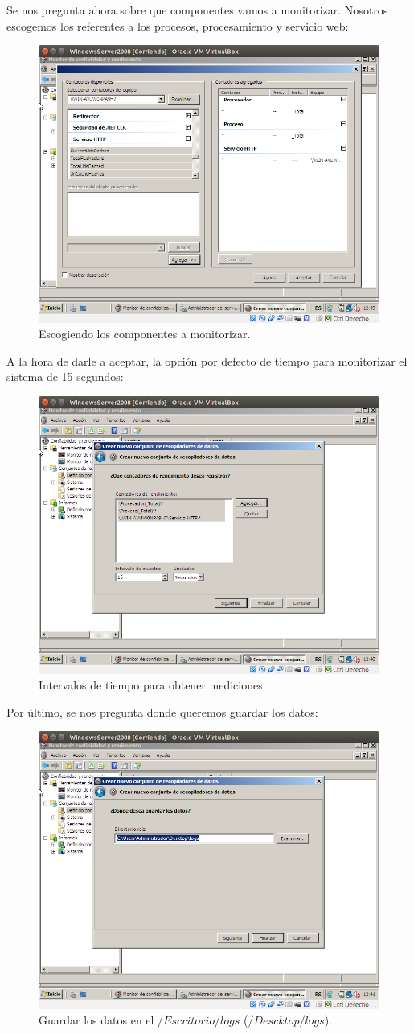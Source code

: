 \begin{itemize}
		Se nos pregunta ahora sobre que componentes vamos a monitorizar. Nosotros escogemos los referentes a los procesos, procesamiento y servicio web:\\
		\begin{figure}[H]
		\centering
		\includegraphics[width=0.6\linewidth]{MonitorizarWindowsServicios}
		\caption[ServiciosWindows]{Escogiendo los componentes a monitorizar.}
		\label{fig:MonitorizarWindowsServicios}
		\end{figure}
		
		A la hora de darle a aceptar, la opción por defecto de tiempo para monitorizar el sistema de 15 segundos:\\
		\begin{figure}[H]
		\centering
		\includegraphics[width=0.6\linewidth]{Intervalo15seg}
		\caption[intervalos]{Intervalos de tiempo para obtener mediciones.}
		\label{fig:Intervalo15seg}
		\end{figure}
		Por último, se nos pregunta donde queremos guardar los datos:\\
		\begin{figure}[H]
		\centering
		\includegraphics[width=0.6\linewidth]{EscritorioLogs}
		\caption[GuardarDatos]{Guardar los datos en el $/Escritorio/logs$ ($/Descktop/logs$).}
		\label{fig:EscritorioLogs}
		\end{figure}
		

\end{itemize}
